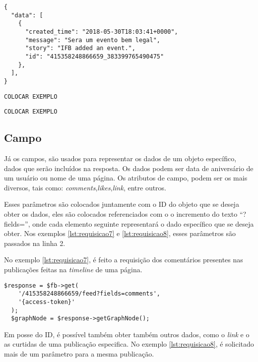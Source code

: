 \begin{lstlisting}[caption={Resposta da requisição \ref{lst:eventosPagina} (Eventos)},label={lst:respostaEventos}]
{
  "data": [
    {
      "created_time": "2018-05-30T18:03:41+0000",
      "message": "Sera um evento bem legal",
      "story": "IFB added an event.",
      "id": "415358248866659_383399765490475"
    },
  ],
}
\end{lstlisting} 

\begin{lstlisting}[caption={Resposta da requisição \ref{lst:comentariosPostagem} (Comentários)},label={lst:respostaComentarios}]
COLOCAR EXEMPLO
\end{lstlisting} 

\begin{lstlisting}[caption={Resposta da requisição \ref{lst:curtidasComentario} (Likes)},label={lst:respostaCurtidas}]
COLOCAR EXEMPLO
\end{lstlisting} 

\subsection{Campo}
Já os campos, são usados para representar os dados de um objeto específico, dados que serão incluídos na resposta. Os dados podem ser data de aniversário de um usuário ou nome de uma página. Os atributos de campo, podem ser os mais diversos, tais como: \textit{comments},\textit{likes},\textit{link}, entre outros. 

Esses parâmetros são colocados juntamente com o ID do objeto que se deseja obter os dados, eles são colocados referenciados com o o incremento do texto ``?fields='', onde cada elemento seguinte representará o dado específico que se deseja obter. Nos exemplos \ref{lst:requisicao7} e \ref{lst:requisicao8}, esses parâmetros são passados na linha 2.

No exemplo \ref{lst:requisicao7}, é feito a requisição dos comentários presentes nas publicações feitas na \textit{timeline} de uma página.

\begin{lstlisting}[caption={Requisitar os comentários de todas as publicações da página},label={lst:requisicao7}]
  $response = $fb->get(
    '/415358248866659/feed?fields=comments',
    '{access-token}' 
  );
  $graphNode = $response->getGraphNode(); 
\end{lstlisting}

Em posse do ID, é possível também obter também outros dados, como o \textit{link} e o as curtidas de uma publicação especifica. No exemplo \ref{lst:requisicao8}, é solicitado mais de um parâmetro para a mesma publicação.

